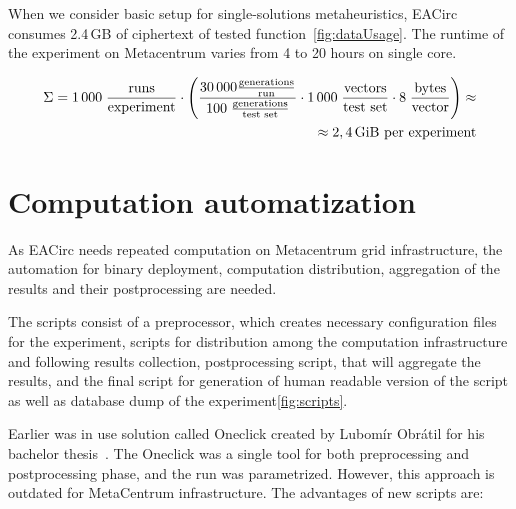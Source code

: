 \documentclass[
  print, %
  Table,   %
  nolof,     %
  nolot,     %
  11pt, %
  oneside  %
]{fithesis3}
\begin{document}
When we consider basic setup for single-solutions metaheuristics, EACirc consumes 2.4\,GB of ciphertext of tested function~\cref{fig:dataUsage}. The runtime of the experiment on Metacentrum varies from 4 to 20 hours on single core.

\begin{figure*}[t]
    \begin{equation*}
        \begin{aligned}
    \Sigma = 1\,000 \;
             \frac{\textnormal{runs}}
                  {\textnormal{experiment}}
             \cdot
             \left(
             \frac{30\,000 \frac{\textnormal{generations}}{\textnormal{run}}}
                  {100 \; \frac{\textnormal{generations}}{\textnormal{test set}}}
             \cdot
             1\,000 \;
             \frac{\textnormal{vectors}}
                  {\textnormal{test set}}
             \cdot
             8 \;
             \frac{\textnormal{bytes}}
                  {\textnormal{vector}}
             \right) \approx\\
             \approx 2,4 \textnormal{\,GiB per experiment}
        \end{aligned}
    \end{equation*}
    \caption{The amount of data analyzed by EACirc for a single configuration of randomness testing experiment.}
    \label{fig:dataUsage}
\end{figure*}


\section{Computation automatization}

As EACirc needs repeated computation on Metacentrum grid infrastructure, the automation for binary deployment, computation distribution, aggregation of the results and their postprocessing are needed.

The scripts consist of a preprocessor, which creates necessary configuration files for the experiment, scripts for distribution among the computation infrastructure and following results collection, postprocessing script, that will aggregate the results, and the final script for generation of human readable version of the script as well as database dump of the experiment\cref{fig:scripts}.

Earlier was in use solution called Oneclick created by Lubomír Obrátil for his bachelor thesis~\cite{obratilBcThesis}. The Oneclick was a single tool for both preprocessing and postprocessing phase, and the run was parametrized. However, this approach is outdated for MetaCentrum infrastructure. The advantages of new scripts are: 
\end{document}
